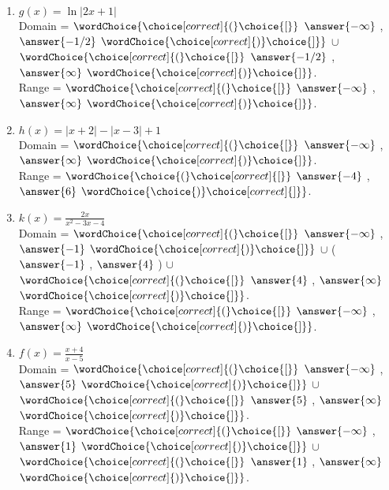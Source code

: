 \documentclass{ximera}
\begin{document}
\begin{exercise}
\begin{enumerate}
\item $g(x) =  \ln|2x+1|$ \\
Domain = $\wordChoice{\choice[correct]{(}\choice{[}}$ 
$\answer{-\infty}$ , $\answer{-1/2}$ 
$\wordChoice{\choice[correct]{)}\choice{]}}$ 
$\cup$  
$\wordChoice{\choice[correct]{(}\choice{[}}$ 
$\answer{-1/2}$ , $\answer{\infty}$ 
$\wordChoice{\choice[correct]{)}\choice{]}}$.\\
Range = $\wordChoice{\choice[correct]{(}\choice{[}}$ 
$\answer{-\infty}$ , $\answer{\infty}$ 
$\wordChoice{\choice[correct]{)}\choice{]}}$.


\item $h(x) =  |x+2|-|x-3|+1$ \\
Domain = $\wordChoice{\choice[correct]{(}\choice{[}}$ 
$\answer{-\infty}$ , $\answer{\infty}$ 
$\wordChoice{\choice[correct]{)}\choice{]}}$.\\
Range = $\wordChoice{\choice{(}\choice[correct]{[}}$ $\answer{-4}$ , $\answer{6}$ $\wordChoice{\choice{)}\choice[correct]{]}}$.


\item $k(x)= \frac{2x}{x^2-3x-4}$\\
Domain = $\wordChoice{\choice[correct]{(}\choice{[}}$ 
$\answer{-\infty}$ , $\answer{-1}$ 
$\wordChoice{\choice[correct]{)}\choice{]}}$ 
$\cup$  
\Big( 
$\answer{-1}$ , $\answer{4}$ 
\Big)
$\cup$  
$\wordChoice{\choice[correct]{(}\choice{[}}$ 
$\answer{4}$ , $\answer{\infty}$ 
$\wordChoice{\choice[correct]{)}\choice{]}}$.\\
Range = $\wordChoice{\choice[correct]{(}\choice{[}}$ 
$\answer{-\infty}$ , $\answer{\infty}$ 
$\wordChoice{\choice[correct]{)}\choice{]}}$.


\item $f(x) =  \frac{x+4}{x-5}$\\
Domain = $\wordChoice{\choice[correct]{(}\choice{[}}$ 
$\answer{-\infty}$ , $\answer{5}$ 
$\wordChoice{\choice[correct]{)}\choice{]}}$ 
$\cup$  
$\wordChoice{\choice[correct]{(}\choice{[}}$ 
$\answer{5}$ , $\answer{\infty}$ 
$\wordChoice{\choice[correct]{)}\choice{]}}$.\\
Range = $\wordChoice{\choice[correct]{(}\choice{[}}$ 
$\answer{-\infty}$ , $\answer{1}$ 
$\wordChoice{\choice[correct]{)}\choice{]}}$ 
$\cup$  
$\wordChoice{\choice[correct]{(}\choice{[}}$ 
$\answer{1}$ , $\answer{\infty}$ 
$\wordChoice{\choice[correct]{)}\choice{]}}$.

\end{enumerate}

\end{exercise}
\end{document}

